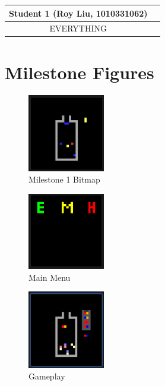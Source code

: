 \documentclass{article}
\begin{document}
\begin{center}
\begin{tabular}{|| c | c ||}
\hline
 Student 1 (Roy Liu, 1010331062) \\ 
 \hline
 EVERYTHING\\
 \hline
\end{tabular}
\end{center}

\section{Milestone Figures}

\begin{figure}[ht!]
    \centering
    \includegraphics[width=0.3\textwidth]{milestone_1.png}
    \caption{Milestone 1 Bitmap}
    \label{Instructions}
\end{figure}

\begin{figure}[ht!]
    \centering
    \includegraphics[width=0.3\textwidth]{main_menu.png}
    \caption{Main Menu}
    \label{Instructions}
\end{figure}

\begin{figure}[ht!]
    \centering
    \includegraphics[width=0.3\textwidth]{gameplay.png}
    \caption{Gameplay}
    \label{Instructions}
\end{figure}
\end{document}
